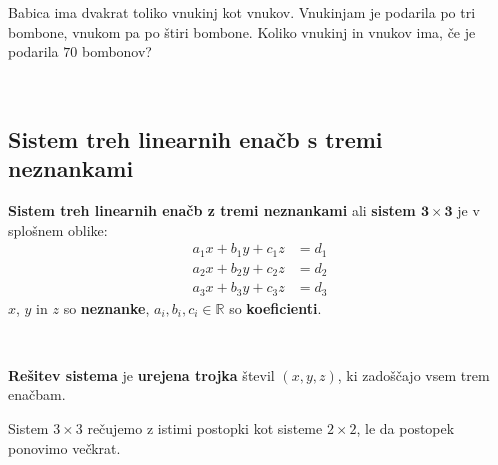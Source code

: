             \begin{naloga}
                Babica ima dvakrat toliko vnukinj kot vnukov. Vnukinjam je podarila po tri bombone, vnukom pa po štiri bombone.
                Koliko vnukinj in vnukov ima, če je podarila $70$ bombonov?
                
            \end{naloga}

        


~~~
      
            
            \subsection{Sistem treh linearnih enačb s tremi neznankami}

                \textbf{Sistem treh linearnih enačb z tremi neznankami} ali \textbf{sistem $\mathbf{3\times 3}$} je v splošnem oblike:
                    $$\begin{aligned}
                            a_1x+b_1y+c_1z&=d_1 \\ a_2x+b_2y+c_2z&=d_2 \\ a_3x+b_3y+c_3z&=d_3
                        \end{aligned}$$
                $x$, $y$ in $z$ so \textbf{neznanke}, $a_i,b_i,c_i\in\mathbb{R}$ so \textbf{koeficienti}.
            
~
            
                \textbf{Rešitev sistema} je \textbf{urejena trojka} števil $(x,y,z)$, ki zadoščajo vsem trem enačbam.
            

            
                    Sistem $3\times 3$ rečujemo z istimi postopki kot sisteme $2\times 2$, le da postopek ponovimo večkrat.
            

        
~~~


